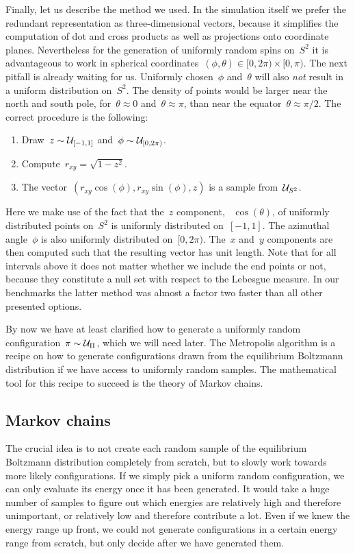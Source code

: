 Finally, let us describe the method we used. In the simulation itself we prefer
the redundant representation as three-dimensional vectors, because it simplifies
the computation of dot and cross products as well as projections onto coordinate
planes. Nevertheless for the generation of uniformly random spins on~$S^2$ it is
advantageous to work in spherical coordinates~$(\phi, \theta) \in [0,2\pi)
\times [0,\pi)$. The next pitfall is already waiting for us. Uniformly
chosen~$\phi$ and~$\theta$ will also \emph{not} result in a uniform distribution
on~$S^2$. The density of points would be larger near the north and south pole,
\ie{} for~$\theta \approx 0$ and~$\theta \approx \pi$, than near the
equator~$\theta \approx \pi/2$. The correct procedure is the following:
%
\begin{enumerate}
  \item Draw~$z \sim \mathcal{U}_{[-1,1]}$ and~$\phi \sim \mathcal{U}_{[0,2\pi)}$.
  \item Compute~$r_{xy} = \sqrt{1 - z^2}$.
  \item The vector~$(r_{xy} \cos(\phi), r_{xy} \sin(\phi), z)$ is a sample
    from~$\mathcal{U}_{S^2}$.
\end{enumerate}
%
Here we make use of the fact that the~$z$ component, \ie{}~$\cos(\theta)$, of
uniformly distributed points on~$S^2$ is uniformly distributed on~$[-1,1]$. The
azimuthal angle~$\phi$ is also uniformly distributed on~$[0,2\pi)$. The~$x$
and~$y$ components are then computed such that the resulting vector has unit
length. Note that for all intervals above it does not matter whether we include
the end points or not, because they constitute a null set with respect to the
Lebesgue measure. In our benchmarks the latter method was almost a factor two
faster than all other presented options.

By now we have at least clarified how to generate a uniformly random
configuration~$\pi \sim \mathcal{U}_{\Pi}$, which we will need later. The Metropolis
algorithm is a recipe on how to generate configurations drawn from the
equilibrium Boltzmann distribution if we have access to uniformly random
samples. The mathematical tool for this recipe to succeed is the theory of
Markov chains.

\subsection{Markov chains}

The crucial idea is to not create each random sample of the equilibrium
Boltzmann distribution completely from scratch, but to slowly work towards more
likely configurations. If we simply pick a uniform random configuration, we can
only evaluate its energy once it has been generated. It would take a huge number
of samples to figure out which energies are relatively high and therefore
unimportant, or relatively low and therefore contribute a lot. Even if we knew
the energy range up front, we could not generate configurations in a certain
energy range from scratch, but only decide after we have generated them.

